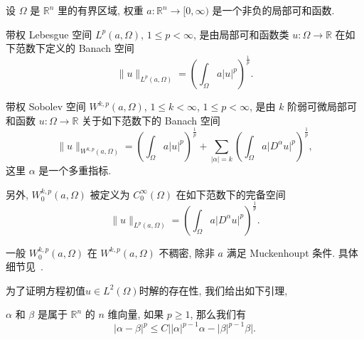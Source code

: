 \documentclass[oneside,longtitle]{LZUthesis}
\numberwithin{equation}{chapter}
\newcommand*\abs[1]{\lvert#1\rvert}
\newcommand*\norm[1]{\lVert#1\rVert}
\newcommand\R{\mathbb{R}}
\begin{document}
设 $\Omega$ 是 $\R^n$ 里的有界区域, 权重
$a \colon \R^n \to [0, \infty)$
是一个非负的局部可和函数.
\begin{definition}
	带权 Lebesgue 空间 $L^p(a, \Omega)$, $1 \leq p < \infty$,
	是由局部可和函数类
	$u \colon \Omega \to \R$ 在如下范数下定义的 Banach 空间
	\begin{equation*}
		\norm{u}_{L^p(a,\Omega)} =
		\left( \int_{\Omega}a\abs{u}^p \right)^{\frac{1}{p}}.
	\end{equation*}
\end{definition}
\begin{definition}
	带权 Sobolev 空间 $W^{k,p}(a,\Omega)$,
	$1 \leq k < \infty$, $1 \leq p < \infty$,
	是由 $k$ 阶弱可微局部可和函数
	$u \colon \Omega \to \R$ 关于如下范数下的 Banach 空间
	\begin{equation*}
		\norm{u}_{W^{k,p}(a,\Omega)} =
		\left( \int_{\Omega}a\abs{u}^p \right)^{\frac{1}{p}}
		+ \sum_{\abs{\alpha}=k}
		\left( \int_{\Omega}a\abs{D^{\alpha}u}^p \right)^{\frac{1}{p}},
	\end{equation*}
	这里 $\alpha$ 是一个多重指标.

	另外,
	$W_0^{k,p}(a,\Omega)$ 被定义为
	$C_0^{\infty}(\Omega)$ 在如下范数下的完备空间
	\begin{equation*}
		\norm{u}_{L^p(a,\Omega)} =
		\left( \int_{\Omega}a\abs{D^{\alpha}u}^p \right)^{\frac{1}{p}}.
	\end{equation*}
\end{definition}
\begin{remark}
	一般 $W_0^{k,p}(a,\Omega)$ 在
	$W^{k,p}(a,\Omega)$ 不稠密, 除非 $a$ 满足 Muckenhoupt 条件. 具体细节见~\cite{goldshteinWeightedSobolevSpaces2009}.
\end{remark}
为了证明方程初值$u \in L^2(\Omega)$时解的存在性, 我们给出如下引理,
\begin{lemma}
	$\alpha$ 和 $\beta$ 是属于 $\R^{n}$ 的 $n$ 维向量, 如果 $p \geq 1$, 那么我们有
	\begin{equation}\label{eq:p_ineq}
		\abs{\alpha-\beta}^p \leq C\abs{\abs{\alpha}^{p-1}\alpha - \abs{\beta}^{p-1}\beta}.
	\end{equation}
\end{lemma}
\end{document}
